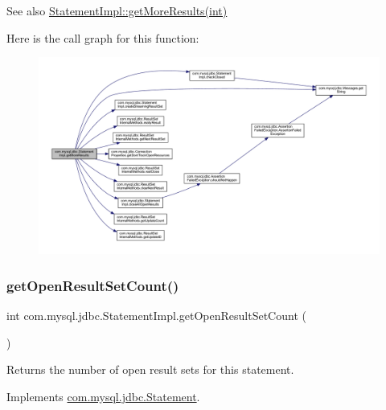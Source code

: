 \begin{DoxySeeAlso}{See also}
\mbox{\hyperlink{classcom_1_1mysql_1_1jdbc_1_1_statement_impl_ae5d2fb5a67dcfe89312b110c52e2194d}{Statement\+Impl\+::get\+More\+Results(int)}} 
\end{DoxySeeAlso}
Here is the call graph for this function\+:
\nopagebreak
\begin{figure}[H]
\begin{center}
\leavevmode
\includegraphics[width=350pt]{classcom_1_1mysql_1_1jdbc_1_1_statement_impl_ae5d2fb5a67dcfe89312b110c52e2194d_cgraph}
\end{center}
\end{figure}
\mbox{\label{classcom_1_1mysql_1_1jdbc_1_1_statement_impl_ab14de7277504c8cd025b3af5a367beba}} 
\subsubsection{\texorpdfstring{get\+Open\+Result\+Set\+Count()}{getOpenResultSetCount()}}
{\footnotesize\ttfamily int com.\+mysql.\+jdbc.\+Statement\+Impl.\+get\+Open\+Result\+Set\+Count (\begin{DoxyParamCaption}{ }\end{DoxyParamCaption})}

Returns the number of open result sets for this statement. 

Implements \mbox{\hyperlink{interfacecom_1_1mysql_1_1jdbc_1_1_statement_ac05ee0ee7cf1de370e7206762dc40d21}{com.\+mysql.\+jdbc.\+Statement}}.

